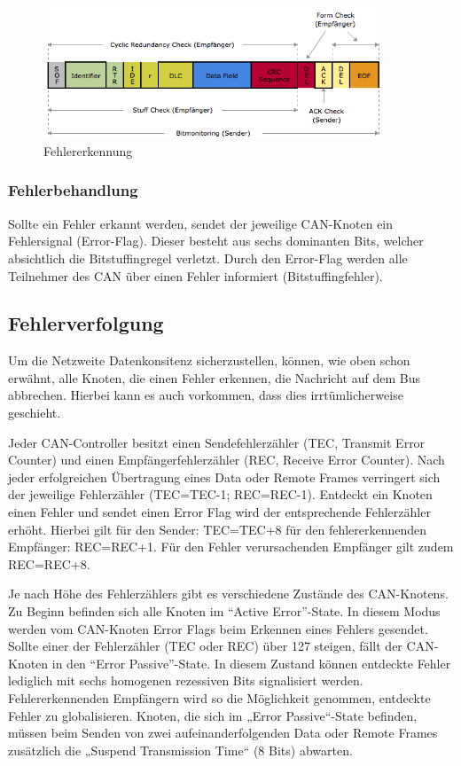\begin{figure}[h] 
\centering
\includegraphics[width=0.9\textwidth]{figures/errcheck}
\caption{Fehlererkennung \citep{VEC}} 
\label{pic:errcheck}
\end{figure} 

\subsubsection{Fehlerbehandlung}

Sollte ein Fehler erkannt werden, sendet der jeweilige CAN-Knoten ein Fehlersignal (Error-Flag). Dieser
besteht aus sechs dominanten Bits, welcher absichtlich die Bitstuffingregel verletzt. Durch den Error-Flag
werden alle Teilnehmer des CAN über einen Fehler informiert (Bitstuffingfehler).

\subsection{Fehlerverfolgung}

Um die Netzweite Datenkonsitenz sicherzustellen, können, wie oben schon erwähnt, alle
Knoten, die einen Fehler erkennen, die Nachricht auf dem Bus abbrechen. Hierbei kann
es auch vorkommen, dass dies irrtümlicherweise geschieht.

Jeder CAN-Controller besitzt einen Sendefehlerzähler (TEC, Transmit Error Counter) und einen 
Empfängerfehlerzähler (REC, Receive Error Counter). Nach jeder erfolgreichen Übertragung eines 
Data oder Remote Frames verringert sich der jeweilige Fehlerzähler (TEC=TEC-1; REC=REC-1). 
Entdeckt ein Knoten einen Fehler und sendet einen Error Flag wird der entsprechende Fehlerzähler 
erhöht. Hierbei gilt für den Sender: TEC=TEC+8 für den fehlererkennenden Empfänger: REC=REC+1.
Für den Fehler verursachenden Empfänger gilt zudem REC=REC+8.

Je nach Höhe des Fehlerzählers gibt es verschiedene Zustände des CAN-Knotens. Zu Beginn befinden
sich alle Knoten im ``Active Error''-State. In diesem Modus werden vom CAN-Knoten Error Flags beim 
Erkennen eines Fehlers gesendet. Sollte einer der Fehlerzähler (TEC oder REC) über 127 steigen, fällt 
der CAN-Knoten in den ``Error Passive''-State. In diesem Zustand können entdeckte Fehler lediglich 
mit sechs homogenen rezessiven Bits signalisiert werden. Fehlererkennenden Empfängern wird so die 
Möglichkeit genommen, entdeckte Fehler zu globalisieren. Knoten, die sich im „Error Passive“-State 
befinden, müssen beim Senden von zwei aufeinanderfolgenden Data oder Remote Frames zusätzlich 
die „Suspend Transmission Time“ (8 Bits) abwarten.

